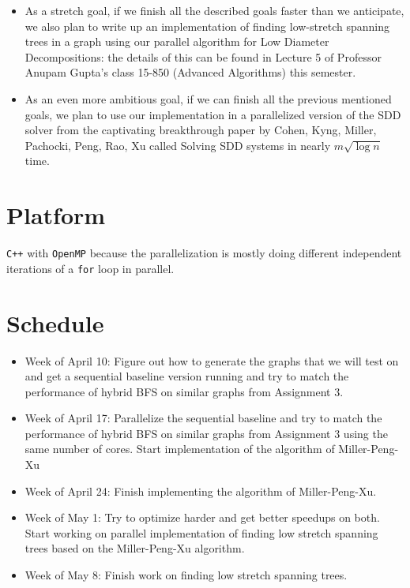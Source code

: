 \documentclass[11pt]{scrartcl}
\theoremstyle{plain}
\theoremstyle{definition}
\theoremstyle{remark}
\begin{document}
\begin{itemize}
\item As a stretch goal, if we finish all the described goals faster than we anticipate, we also
plan to write up an implementation of finding low-stretch spanning trees in a graph using
our parallel algorithm for Low Diameter Decompositions: the details of this can be found in
Lecture 5 of Professor Anupam Gupta's class 15-850 (Advanced Algorithms) this semester.

\item As an even more ambitious goal, if we can finish all the previous mentioned goals, we plan to
use our implementation in a parallelized version of the SDD solver from the
captivating breakthrough paper by Cohen, Kyng, Miller, Pachocki, Peng, Rao, Xu called
Solving SDD systems in nearly $m\sqrt{\log{n}}$ time. \cite{cohen2014solving}

\end{itemize}

\section{Platform}
\texttt{C++} with \texttt{OpenMP} because the parallelization is mostly
doing different independent iterations of a \texttt{for} loop in parallel.


\section{Schedule}
\begin{itemize}
\item Week of April 10: Figure out how to generate the graphs that we will test on and get a
sequential baseline version running and try to match the performance of hybrid BFS on similar
graphs from Assignment 3.

\item Week of April 17: Parallelize the sequential baseline and try to match the
performance of hybrid BFS on similar graphs from Assignment 3 using the same number of cores.
Start implementation of the algorithm of Miller-Peng-Xu

\item Week of April 24: Finish implementing the algorithm of Miller-Peng-Xu.

\item Week of May 1: Try to optimize harder and get better speedups on both. Start
working on parallel implementation of finding low stretch spanning trees based on
the Miller-Peng-Xu algorithm.

\item Week of May 8: Finish work on finding low stretch spanning trees.

\end{itemize}
\end{document}
